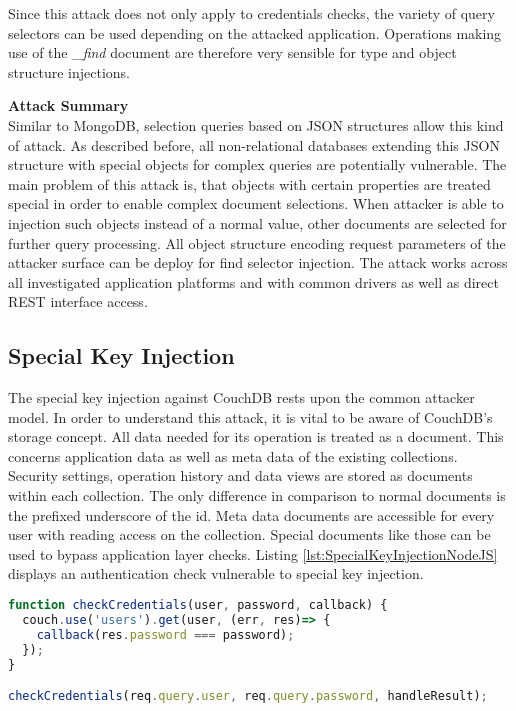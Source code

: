 Since this attack does not only apply to credentials checks, the variety of query selectors can be used depending on the attacked application. Operations making use of the \emph{\_find} document are therefore very sensible for type and object structure injections.

\textbf{Attack Summary} \\
Similar to MongoDB, selection queries based on JSON structures allow this kind of attack. As described before, all non-relational databases extending this JSON structure with special objects for complex queries are potentially vulnerable. The main problem of this attack is, that objects with certain properties are treated special in order to enable complex document selections. When attacker is able to injection such objects instead of a normal value, other documents are selected for further query processing. All object structure encoding request parameters of the attacker surface can be deploy for find selector injection. The attack works across all investigated application platforms and with common drivers as well as direct REST interface access. 

\subsection{Special Key Injection}
The special key injection against CouchDB rests upon the common attacker model. In order to understand this attack, it is vital to be aware of CouchDB's storage concept. All data needed for its operation is treated as a document. This concerns application data as well as meta data of the existing collections. Security settings, operation history and data views are stored as documents within each collection. The only difference in comparison to normal documents is the prefixed underscore of the id. Meta data documents are accessible for every user with reading access on the collection. Special documents like those can be used to bypass application layer checks. Listing \ref{lst:SpecialKeyInjectionNodeJS} displays an authentication check vulnerable to special key injection. \\

\begin{lstlisting}[caption={Vulnerable NodeJS example for special key injection against CouchDB}, label={lst:SpecialKeyInjectionNodeJS}, language=JavaScript]
function checkCredentials(user, password, callback) {
  couch.use('users').get(user, (err, res)=> {
    callback(res.password === password);
  });
}

checkCredentials(req.query.user, req.query.password, handleResult);
\end{lstlisting}

